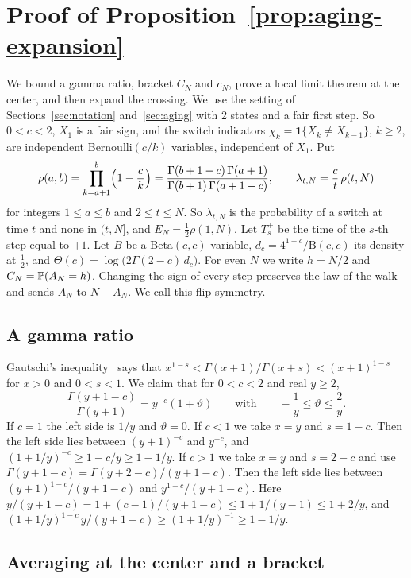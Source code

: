 \section{Proof of Proposition~\ref{prop:aging-expansion}}\label{app:aging}

We bound a gamma ratio, bracket $C_N$ and $c_N$, prove a local limit theorem
at the center, and then expand the crossing. We use the setting of
Sections~\ref{sec:notation} and~\ref{sec:aging} with 2 states and a fair first step. So $0<c<2$, $X_1$ is a fair sign, and the switch indicators
$\chi_k=\mathbf 1\{X_k\ne X_{k-1}\}$, $k\ge2$, are independent
Bernoulli$(c/k)$ variables, independent of $X_1$. Put
\[
\rho(a,b)=\prod_{k=a+1}^{b}\Bigl(1-\frac ck\Bigr)
=\frac{\Gamma(b+1-c)\,\Gamma(a+1)}{\Gamma(b+1)\,\Gamma(a+1-c)},\qquad
\lambda_{t,N}=\frac ct\,\rho(t,N)
\]
for integers $1\le a\le b$ and $2\le t\le N$. So $\lambda_{t,N}$ is the
probability of a switch at time $t$ and none in $(t,N]$, and
$E_N=\frac12\rho(1,N)$. Let $T^+_s$ be the time of the $s$-th step equal to
$+1$. Let $B$ be a Beta$(c,c)$ variable, $d_c=4^{1-c}/\mathrm B(c,c)$ its
density at $\frac12$, and $\Theta(c)=\log\bigl(2\Gamma(2-c)\,d_c\bigr)$. For
even $N$ we write $h=N/2$ and $C_N=\mathbb{P}(A_N=h)$. Changing the sign of every
step preserves the law of the walk and sends $A_N$ to $N-A_N$. We call this
flip symmetry.

\subsection{A gamma ratio}

Gautschi's inequality~\cite[5.6.4]{dlmf} says that
$x^{1-s}<\Gamma(x+1)/\Gamma(x+s)<(x+1)^{1-s}$ for $x>0$ and $0<s<1$. We
claim that for $0<c<2$ and real $y\ge2$,
\begin{equation}\label{eq:D-gamma}
\frac{\Gamma(y+1-c)}{\Gamma(y+1)}=y^{-c}(1+\vartheta)\qquad\text{with}\qquad
-\frac1y\le\vartheta\le\frac2y .
\end{equation}
If $c=1$ the left side is $1/y$ and $\vartheta=0$. If $c<1$ we take $x=y$ and
$s=1-c$. Then the left side lies between $(y+1)^{-c}$ and $y^{-c}$, and
$(1+1/y)^{-c}\ge1-c/y\ge1-1/y$. If $c>1$ we take $x=y$ and $s=2-c$ and use
$\Gamma(y+1-c)=\Gamma(y+2-c)/(y+1-c)$. Then the left side lies between
$(y+1)^{1-c}/(y+1-c)$ and $y^{1-c}/(y+1-c)$. Here
$y/(y+1-c)=1+(c-1)/(y+1-c)\le1+1/(y-1)\le1+2/y$, and
$(1+1/y)^{1-c}\,y/(y+1-c)\ge(1+1/y)^{-1}\ge1-1/y$.

\subsection{Averaging at the center and a bracket}

